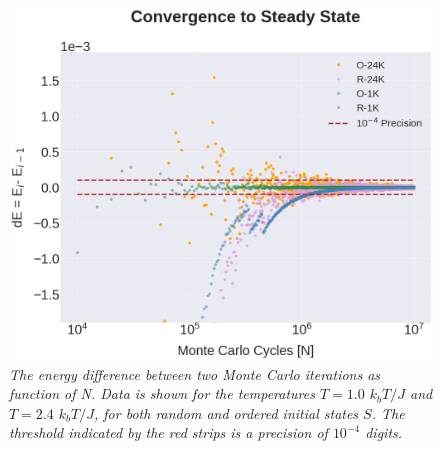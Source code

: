 \documentclass[%
reprint,nofootinbib,
amsmath,amssymb,
aps,
]{revtex4-1}
\begin{document}
\begin{figure}[!h]
	\includegraphics[width = \columnwidth]{Figures/Plot3.png} 
	\caption{\label{4C3} \textit{ The energy difference between two Monte Carlo iterations as function of N. Data is shown for the temperatures $T = 1.0$ $k_bT/J$ and $T = 2.4$ $k_bT/J$, for both random and ordered initial states $S$. The threshold indicated by the red strips is a precision of $10^{-4}$ digits.}}
\end{figure}  
\end{document}
